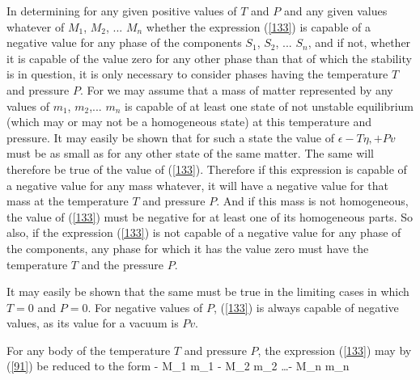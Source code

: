 \documentclass[12pt]{article}
\begin{document}
In determining for any given positive values of $T$ and $P$ and any given values whatever of $M_1$, $M_2$, ... $M_n$ whether the expression (\ref{133}) is capable of a negative value for any phase of the components $S_1$, $S_2$, ... $S_n$, and if not, whether it is capable of the value zero for any other phase than that of which the stability is in question, it is only necessary to consider phases having the temperature $T$ and pressure $P$. For we may assume that a mass of matter represented by any values of $m_1$, $m_2$,... $m_n$ is capable of at least one state of not unstable equilibrium (which may or may not be a homogeneous state) at this temperature and pressure. It may easily be shown that for such a state the value of $\epsilon-T\eta, + Pv$ must be as small as for any other state of the same matter. The same will therefore be true of the value of (\ref{133}). Therefore if this expression is capable of a negative value for any mass whatever, it will have a negative value for that mass at the temperature $T$ and pressure $P$. And if this mass is not homogeneous, the value of (\ref{133}) must be negative for at least one of its homogeneous parts. So also, if the expression (\ref{133}) is not capable of a negative value for any phase of the components, any phase for which it has the value zero must have the temperature $T$ and the pressure $P$.


It may easily be shown that the same must be true in the limiting cases in which $T =0$ and $P =0$. For negative values of $P$, (\ref{133}) is always capable of negative values, as its value for a vacuum is $Pv$.


For any body of the temperature $T$ and pressure $P$, the expression
(\ref{133}) may by (\ref{91}) be reduced to the form
\eqs \xi - M_1 m_1 - M_2 m_2 \dots - M_n m_n \label{135}\eqe
\end{document}
